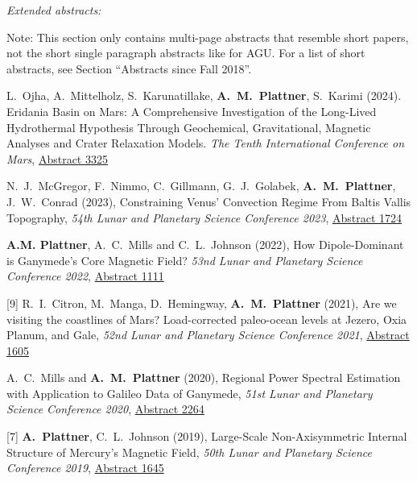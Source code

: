 \documentclass[10pt]{article}
\begin{document}
\clearpage
\emph{Extended abstracts:}


\vspace{0.2cm}
Note: This section only contains multi-page abstracts that resemble short papers, not the short single paragraph abstracts like for AGU. For a list of short abstracts, see Section ``Abstracts since Fall 2018''.

\spcp
\shift [12] L.\ Ojha, A.\ Mittelholz, S.\ Karunatillake, \textbf{A.\ M.\ Plattner}, S.\ Karimi (2024). Eridania Basin on Mars: A Comprehensive Investigation of the Long-Lived Hydrothermal Hypothesis Through Geochemical, Gravitational, Magnetic Analyses and Crater Relaxation Models. \emph{The Tenth International Conference on Mars}, \href{https://www.hou.usra.edu/meetings/tenthmars2024/pdf/3325.pdf}{Abstract 3325}

\spcp
\shift [11] N.~J.~McGregor, F.~Nimmo, C.~Gillmann, G.~J.~Golabek, \textbf{A.~M.~Plattner}, J.~W.~Conrad (2023), Constraining Venus' Convection Regime From Baltis Vallis Topography, \emph{54th Lunar and Planetary Science Conference 2023},
\href{https://www.hou.usra.edu/meetings/lpsc2023/pdf/1724.pdf}{Abstract 1724}


\spcp
\shift [10] \textbf{A.M. Plattner}, A.~C.~Mills and C.~L.~Johnson (2022), How Dipole-Dominant is Ganymede's Core Magnetic Field?
\emph{53nd Lunar and Planetary Science Conference 2022},
\href{https://www.hou.usra.edu/meetings/lpsc2022/pdf/1111.pdf}{Abstract 1111}

\spcp
\hspace{-0.5cm}[9] R.~I.~Citron, M.~Manga, D.~Hemingway, \textbf{A.~M.~Plattner} (2021),
Are we visiting the coastlines of Mars? Load-corrected paleo-ocean levels at Jezero, Oxia Planum, and Gale,
\emph{52nd Lunar and Planetary Science Conference 2021},
\href{https://www.hou.usra.edu/meetings/lpsc2021/pdf/1605.pdf}{Abstract 1605}

\spcp
\hspace{-0.77cm} \gr[8] A.~C.~Mills and \textbf{A.~M.~Plattner}
(2020),
Regional Power Spectral Estimation with Application to Galileo Data of Ganymede,
\emph{51st Lunar and Planetary Science Conference 2020},
\href{https://www.hou.usra.edu/meetings/lpsc2020/pdf/2264.pdf}{Abstract 2264}

\spcp
\hspace{-0.5cm}[7] \textbf{A.~Plattner}, C.~L.~Johnson (2019), Large-Scale Non-Axisymmetric Internal Structure of Mercury's Magnetic Field,
\emph{50th Lunar and Planetary Science Conference 2019},
\href{https://www.hou.usra.edu/meetings/lpsc2019/pdf/1645.pdf}{Abstract 1645}
\end{document}
